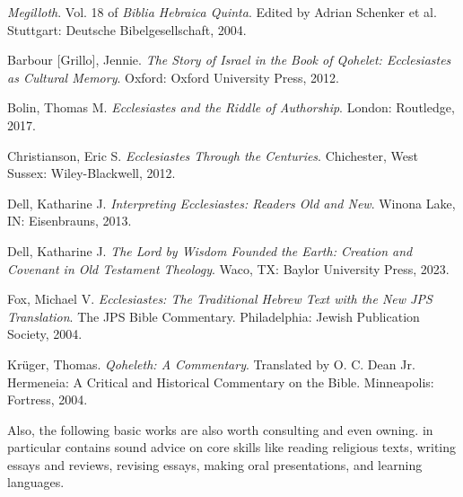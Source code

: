 \documentclass[titlepage]{article}
\begin{document}
\begingroup
\renewcommand{\section}[2]{}%
\begin{thebibliography}{Christianson}%

	 \emph{Megilloth}. Vol. 18 of \emph{Biblia Hebraica Quinta}.
	Edited by Adrian Schenker et al.
	Stuttgart: Deutsche Bibelgesellschaft, 2004.

	 Barbour [Grillo], Jennie.
	\emph{The Story of Israel in the Book of Qohelet: Ecclesiastes as Cultural Memory}.
	Oxford: Oxford University Press, 2012.

	 Bolin, Thomas M.
	\emph{Ecclesiastes and the Riddle of Authorship}.
	London: Routledge, 2017.

	 Christianson, Eric S.
    \emph{Ecclesiastes Through the Centuries}.
    Chichester, West Sussex: Wiley-Blackwell, 2012.

	 Dell, Katharine J.
	\emph{Interpreting Ecclesiastes: Readers Old and New}.
	Winona Lake, IN: Eisenbrauns, 2013.

	 Dell, Katharine J.
	\emph{The Lord by Wisdom Founded the Earth: Creation and Covenant in Old Testament Theology}.
	Waco, TX: Baylor University Press, 2023.

	 Fox, Michael V.
	\emph{Ecclesiastes: The Traditional Hebrew Text with the New JPS Translation}. The JPS Bible Commentary.
	Philadelphia: Jewish Publication Society, 2004.

	 Krüger, Thomas.
	\emph{Qoheleth: A Commentary}. Translated by O. C. Dean Jr. Hermeneia: A Critical and Historical Commentary on the Bible.
	Minneapolis: Fortress, 2004.

\end{thebibliography}
\endgroup

Also, the following basic works are also worth consulting and even owning.
\cite{rlgs} in particular contains sound advice on core skills like
reading religious texts, writing essays and reviews, revising essays,
making oral presentations, and learning languages.
\end{document}
